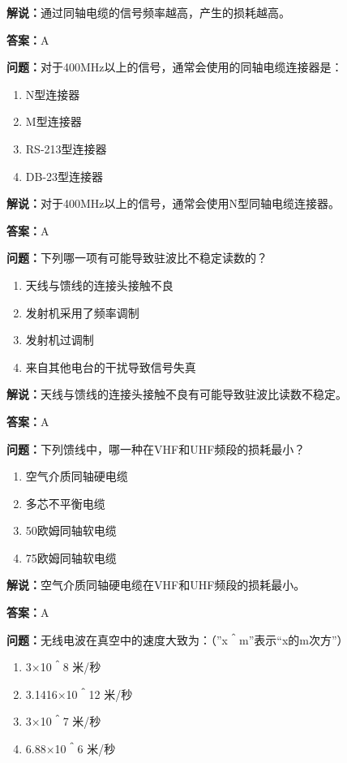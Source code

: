 \documentclass[UTF8]{ctexbook}
\begin{document}
\textbf{解说：}通过同轴电缆的信号频率越高，产生的损耗越高。%

\textbf{答案：}A

\textbf{问题：}对于400MHz以上的信号，通常会使用的同轴电缆连接器是：

\begin{enumerate}[label=\Alph*), leftmargin=3em]
  \item N型连接器
  \item M型连接器
  \item RS-213型连接器
  \item DB-23型连接器
\end{enumerate}

\textbf{解说：}对于400MHz以上的信号，通常会使用N型同轴电缆连接器。%

\textbf{答案：}A

\textbf{问题：}下列哪一项有可能导致驻波比不稳定读数的？

\begin{enumerate}[label=\Alph*), leftmargin=3em]
  \item 天线与馈线的连接头接触不良
  \item 发射机采用了频率调制
  \item 发射机过调制
  \item 来自其他电台的干扰导致信号失真
\end{enumerate}

\textbf{解说：}天线与馈线的连接头接触不良有可能导致驻波比读数不稳定。%

\textbf{答案：}A

\textbf{问题：}下列馈线中，哪一种在VHF和UHF频段的损耗最小？

\begin{enumerate}[label=\Alph*), leftmargin=3em]
  \item 空气介质同轴硬电缆
  \item 多芯不平衡电缆
  \item 50欧姆同轴软电缆
  \item 75欧姆同轴软电缆
\end{enumerate}

\textbf{解说：}空气介质同轴硬电缆在VHF和UHF频段的损耗最小。%

\textbf{答案：}A

\textbf{问题：}无线电波在真空中的速度大致为：（”x＾m”表示“x的m次方”）

\begin{enumerate}[label=\Alph*), leftmargin=3em]
  \item 3×10＾8 米/秒
  \item 3.1416×10＾12 米/秒
  \item 3×10＾7 米/秒
  \item 6.88×10＾6 米/秒
\end{enumerate}
\end{document}
